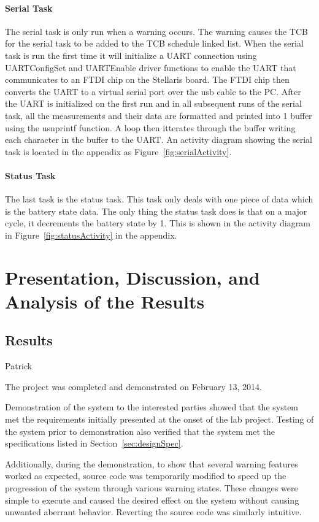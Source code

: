 \documentclass[12pt]{article} %
\begin{document}
	\paragraph{Serial Task}
    The serial task is only run when a warning occurs. The warning causes the TCB for the serial task to be added to the TCB schedule linked list. When the serial task is run the first time it will initialize a UART connection using UARTConfigSet and UARTEnable driver functions to enable the UART that communicates to an FTDI chip on the Stellaris board. The FTDI chip then converts the UART to a virtual serial port over the usb cable to the PC. After the UART is initialized on the first run and in all subsequent runs of the serial task, all the measurements and their data are formatted and printed into 1 buffer using the usnprintf function. A loop then itterates through the buffer writing each character in the buffer to the UART. An activity diagram showing the serial task is located in the appendix as Figure~\ref{fig:serialActivity}.
    
    \paragraph{Status Task}
    The last task is the status task. This task only deals with one piece of data
    which is the battery state data. The only thing the status task does is that on
    a major cycle, it decrements the battery state by 1. This is shown in the
    activity diagram in Figure~\ref{fig:statusActivity} in the appendix.

    \section{Presentation, Discussion, and Analysis of the Results}

    \subsection{Results} Patrick

    The project was completed and demonstrated on February 13, 2014.

    Demonstration of the system to the interested parties showed that the
    system met the requirements initially presented at the onset of the lab
    project.  Testing of the system prior to demonstration also verified that
    the system met the specifications listed in Section~\ref{sec:designSpec}.

    Additionally, during the demonstration, to show that several warning
    features worked as expected, source code was temporarily modified to speed
    up the progression of the system through various warning states. These
    changes were simple to execute and caused the desired effect on the system
    without causing unwanted aberrant behavior. Reverting the source code was
    similarly intuitive.
\end{document}
